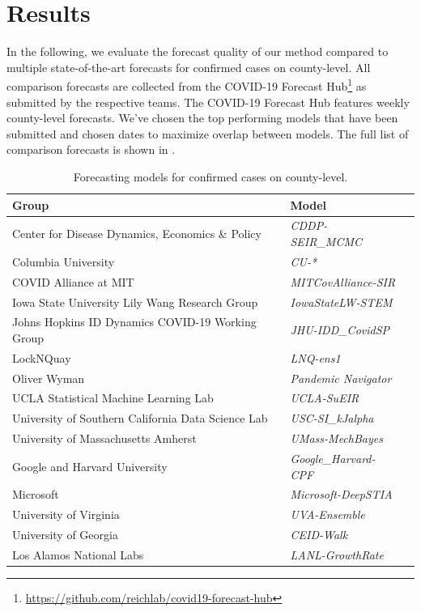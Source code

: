 
\section{Results}
\label{sec:org99c3fc8}
In the following, we evaluate the forecast quality of our method compared to
multiple state-of-the-art forecasts for confirmed cases on
county-level. All comparison forecasts are collected from the COVID-19 Forecast
Hub\footnote{\url{https://github.com/reichlab/covid19-forecast-hub}} as submitted by
the respective teams. The COVID-19 Forecast Hub features weekly county-level forecasts.  
We've chosen the top performing models that have been submitted and chosen dates to 
maximize overlap between models.  The full list of comparison forecasts is shown in .

\begin{table}[t]
\small
\caption{Forecasting models for confirmed cases on county-level.\label{tab:forecasts}}
\centering
\begin{tabular}{lll}
\toprule
\bf Group & \bf Model \\
\midrule
Center for Disease Dynamics, Economics \& Policy & \it CDDP-SEIR\_MCMC & \citep{cddep_seir_mcmc} \\
Columbia University & \it CU-* & \citep{forecasts/columbia} \\
COVID Alliance at MIT & \it MITCovAlliance-SIR & \citep{baek2020limits} \\
Iowa State University Lily Wang Research Group & \it IowaStateLW-STEM & \citep{wang2020spatiotemporal} \\
Johns Hopkins ID Dynamics COVID-19 Working Group & \it JHU-IDD\_CovidSP & \citep{forecasts/jhu_idd_covidsp} \\
LockNQuay & \it LNQ-ens1 & \citep{forecasts/lnq_ens1} \\
Oliver Wyman & \it Pandemic Navigator & \citep{forecasts/oliver_wyman} \\
UCLA Statistical Machine Learning Lab & \it UCLA-SuEIR & \citep{forecasts/Zou2020.05.24.20111989} \\
University of Southern California Data Science Lab & \it USC-SI\_kJalpha & \citep{srivastava2020fast} \\
University of Massachusetts Amherst & \it UMass-MechBayes & \citep{forecasts/umass_mechbayes} \\
Google and Harvard University & \it Google\_Harvard-CPF & \citep{forecasts/google} \\
Microsoft & \it Microsoft-DeepSTIA & \citep{forecasts/microsoft} \\
University of Virginia & \it UVA-Ensemble & \citep{forecasts/uva} \\
University of Georgia & \it CEID-Walk & \citep{forecasts/ceid} \\
Los Alamos National Labs & \it LANL-GrowthRate & \citep{forecasts/lanl} \\
\bottomrule
\end{tabular}
\end{table}

